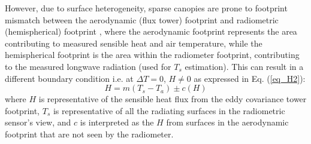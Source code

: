 \documentclass[fleqn,10pt]{wlscirep}
\begin{document}
However, due to surface heterogeneity, sparse canopies are prone to footprint mismatch between the aerodynamic (flux tower) footprint and radiometric (hemispherical) footprint \cite{chu2021representativeness,marcolla2018geometry,morillas2013using}, where the aerodynamic footprint represents the area contributing to measured sensible heat and air temperature, while the hemispherical footprint is the area within the radiometer footprint, contributing to the measured longwave radiation (used for $T_{s}$ estimation). This can result in a different boundary condition i.e. at $\Delta T =0$, $H \not= 0$ as expressed in Eq. (\ref{eq_H2}): %
\begin{equation}\label{eq_H2}
H= m(T_{s} - T_{a}) \pm  c(H)
\end{equation}
where $H$ is representative of the sensible heat flux from the eddy covariance tower footprint, $T_{s}$ is representative of all the radiating surfaces in the radiometric sensor’s view, and $c$ is interpreted as the $H$ from surfaces in the aerodynamic footprint that are not seen by the radiometer. 

\end{document}
